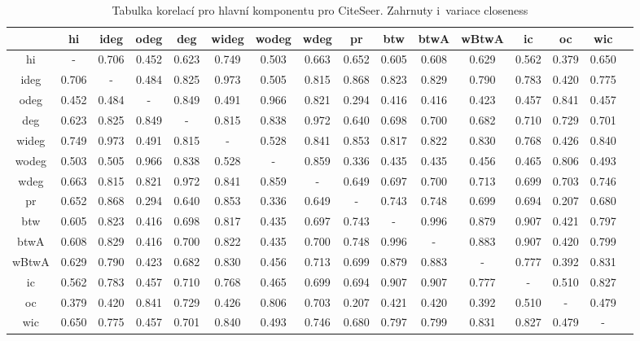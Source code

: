 \documentclass{bakalarka}
\begin{document}
\begin{table}[!ht]
\centering
\caption{Tabulka korelací pro hlavní komponentu pro CiteSeer. Zahrnuty i~variace closeness}
\label{tab:corr4}
\begin{sideways}
\begin{footnotesize}
\begin{tabular}{c|ccccccccccccccc}
\toprule
&hi  &ideg &odeg &deg  &wideg&wodeg&wdeg &pr   &btw  &btwA &wBtwA&ic   &oc   &wic\\
\midrule
hi   &  -  &0.706&0.452&0.623&0.749&0.503&0.663&0.652&0.605&0.608&0.629&0.562&0.379&0.650\\
ideg &0.706&  -  &0.484&0.825&0.973&0.505&0.815&0.868&0.823&0.829&0.790&0.783&0.420&0.775\\
odeg &0.452&0.484&  -  &0.849&0.491&0.966&0.821&0.294&0.416&0.416&0.423&0.457&0.841&0.457\\
deg  &0.623&0.825&0.849&  -  &0.815&0.838&0.972&0.640&0.698&0.700&0.682&0.710&0.729&0.701\\
wideg&0.749&0.973&0.491&0.815&  -  &0.528&0.841&0.853&0.817&0.822&0.830&0.768&0.426&0.840\\
wodeg&0.503&0.505&0.966&0.838&0.528&  -  &0.859&0.336&0.435&0.435&0.456&0.465&0.806&0.493\\
wdeg &0.663&0.815&0.821&0.972&0.841&0.859&  -  &0.649&0.697&0.700&0.713&0.699&0.703&0.746\\
pr   &0.652&0.868&0.294&0.640&0.853&0.336&0.649&  -  &0.743&0.748&0.699&0.694&0.207&0.680\\
btw  &0.605&0.823&0.416&0.698&0.817&0.435&0.697&0.743&  -  &0.996&0.879&0.907&0.421&0.797\\
btwA &0.608&0.829&0.416&0.700&0.822&0.435&0.700&0.748&0.996&  -  &0.883&0.907&0.420&0.799\\
wBtwA&0.629&0.790&0.423&0.682&0.830&0.456&0.713&0.699&0.879&0.883&  -  &0.777&0.392&0.831\\
ic   &0.562&0.783&0.457&0.710&0.768&0.465&0.699&0.694&0.907&0.907&0.777&  -  &0.510&0.827\\
oc   &0.379&0.420&0.841&0.729&0.426&0.806&0.703&0.207&0.421&0.420&0.392&0.510&  -  &0.479\\
wic  &0.650&0.775&0.457&0.701&0.840&0.493&0.746&0.680&0.797&0.799&0.831&0.827&0.479&  -  \\
\bottomrule
\end{tabular}
\end{footnotesize}
\end{sideways}
\end{table}
\end{document}
